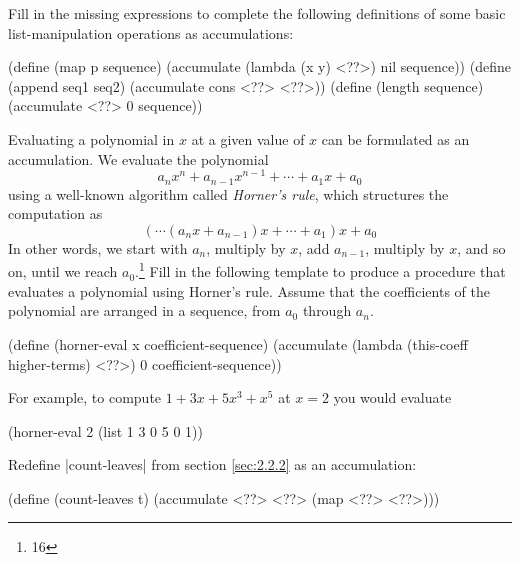 \begin{Exercise}
\label{exc:2.33}
Fill in the missing expressions to complete the following definitions
of some basic list-manipulation operations as accumulations:
\begin{schemedisplay}
(define (map p sequence)
  (accumulate (lambda (x y) <??>) nil sequence))
(define (append seq1 seq2)
  (accumulate cons <??> <??>))
(define (length sequence)
  (accumulate <??> 0 sequence))
\end{schemedisplay}


\begin{Exercise}
\label{exc:2.34}
Evaluating a polynomial in $x$ at a given value of $x$ can be
formulated as an accumulation.  We evaluate the polynomial 
\[a_nx^n + a_{n-1}x^{n-1} + \cdots + a_1x + a_0 \] using a well-known
algorithm called \textit{Horner's rule}, which structures the
computation as \[ (\cdots (a_nx + a_{n-1})x+ \cdots + a_1)x + a_0 \]
In other words, we start with $a_n$, multiply by $x$, add $a_{n-1}$,
multiply by $x$, and so on, until we reach $a_0$.\footnote{16} Fill in
the following template to produce a procedure that evaluates a
polynomial using Horner's rule.  Assume that the coefficients of the
polynomial are arranged in a sequence, from $a_0$ through $a_n$.
\begin{schemedisplay}
(define (horner-eval x coefficient-sequence)
  (accumulate (lambda (this-coeff higher-terms) <??>)
              0
              coefficient-sequence))
\end{schemedisplay}
For example, to compute $1 + 3x + 5x^3 + x^5$ at $x = 2$ you would evaluate
\begin{schemedisplay}
(horner-eval 2 (list 1 3 0 5 0 1))
\end{schemedisplay}
\end{Exercise}

\begin{Exercise}
\label{exc:2.35}
Redefine \scheme|count-leaves| from section \ref{sec:2.2.2} as an
accumulation:
\begin{schemedisplay}
(define (count-leaves t)
  (accumulate <??> <??> (map <??> <??>)))
\end{schemedisplay}
\end{Exercise}


\end{Exercise}
